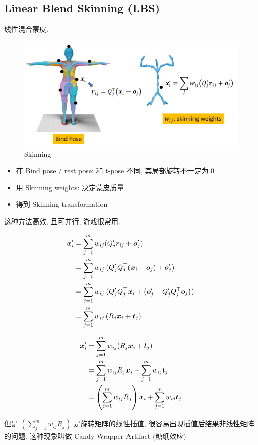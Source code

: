 \subsection{Linear Blend Skinning (LBS)}
线性混合蒙皮.
\begin{figure}[!htb]
    \centering
    \includegraphics[width=0.88\linewidth]{pic/1057/Skinning}
    \caption{Skinning}
\end{figure}

\begin{itemize}
    \item 在 Bind pose / rest pose: 和 t-pose 不同, 其局部旋转不一定为 0
    \item 用 Skinning weights: 决定蒙皮质量
    \item 得到 Skinning transformation
\end{itemize}
这种方法高效, 且可并行, 游戏很常用. 

\begin{align*}
    {\bm{x}}_i'&=\sum_{j=1}^m w_{ij}(Q_j'{\bm{r}}_{ij}+{\bm{o}}_j')\\
    &=\sum_{j=1}^m w_{ij} \left(Q_j'Q_j^\top ({\bm{x}}_i - {\bm{o}}_j)+{\bm{o}}_j'\right)\\
    &=\sum_{j=1}^m w_{ij} \left(Q_j'Q_j^\top {\bm{x}}_i + \left({\bm{o}}_j' - Q_j'Q_j^\top  {\bm{o}}_j \right)\right)\\
    &=\sum_{j=1}^m w_{ij}\left(R_j {\bm{x}}_i + {\bm{t}}_j\right)
\end{align*}

\begin{align*}
    {\bm{x}}_i'&=\sum_{j=1}^m w_{ij}(R_j {\bm{x}}_i + {\bm{t}}_j)\\
    &=\sum_{j=1}^m w_{ij} R_j {\bm{x}}_i + \sum_{j=1}^m w_{ij}{\bm{t}}_j\\
    &=\left(\sum_{j=1}^m w_{ij} R_j \right){\bm{x}}_i + \sum_{j=1}^m w_{ij}{\bm{t}}_j
\end{align*}



但是 $\left(\sum_{j=1}^m w_{ij} R_j \right)$ 是旋转矩阵的线性插值, 很容易出现插值后结果非线性矩阵的问题. 这种现象叫做 Candy-Wrapper Artifact (糖纸效应)

